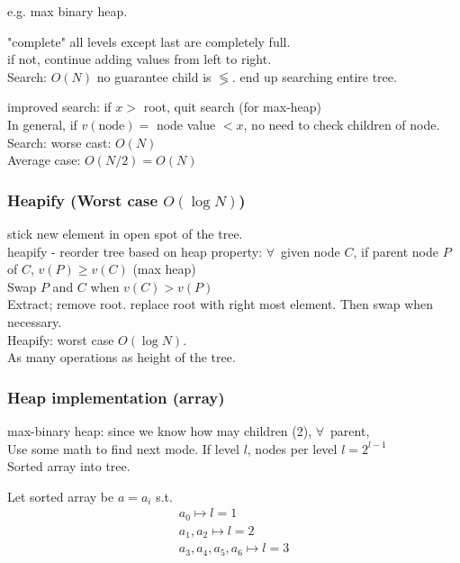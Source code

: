 \documentclass[10pt]{amsart}
\begin{document}
\begin{multicols*}{2}
e.g. max binary heap.

"complete" all levels except last are completely full. \\
if not, continue adding values from left to right. \\

Search: $O(N)$ no guarantee child is $\lessgtr$. end up searching entire tree.

improved search: if $x >$ root, quit search (for max-heap) \\
In general, if $v(\text{node}) =$ node value $< x$, no need to check children of node. \\

Search: worse cast: $O(N)$ \\
\phantom{Search} Average case: $O(N/2) = O(N)$ \\

\subsubsection{Heapify (Worst case $O(\log{N})$)} 

stick new element in open spot of the tree. \\
heapify - reorder tree based on heap property: $\forall \, $ given node $C$, if parent node $P$ of $C$, $v(P) \geq v(C)$ (max heap) \\

Swap $P$ and $C$ when $v(C) > v(P)$ \\
Extract; remove root. replace root with right most element. Then swap when necessary. \\

Heapify: worst case $O(\log{N})$. \\
As many operations as height of the tree.

\subsubsection{Heap implementation (array)}

max-binary heap: since we know how may children (2), $\forall \, $ parent, \\
Use some math to find next mode. If level $l$, nodes per level $l= 2^{l-1}$ \\
Sorted array into tree.

Let sorted array be $a=a_i$ s.t. 
\[
\begin{gathered} 
	a_0 \mapsto l = 1\\ 
a_1, a_2 \mapsto l = 2 \\ 
a_3, a_4, a_5, a_6 \mapsto l = 3 
\end{gathered} 
\]


\end{multicols*}
\end{document}

